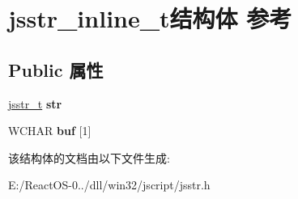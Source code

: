 \hypertarget{structjsstr__inline__t}{}\section{jsstr\+\_\+inline\+\_\+t结构体 参考}
\label{structjsstr__inline__t}
\subsection*{Public 属性}
\begin{DoxyCompactItemize}
\item 
\mbox{\label{structjsstr__inline__t_a8f6131c991535c1ef1b2f115cc5b0e30}} 
\hyperlink{struct__jsstr__t}{jsstr\+\_\+t} {\bfseries str}
\item 
\mbox{\label{structjsstr__inline__t_ac6dfdd7493e1260c4da2658517ff9d7a}} 
W\+C\+H\+AR {\bfseries buf} \mbox{[}1\mbox{]}
\end{DoxyCompactItemize}


该结构体的文档由以下文件生成\+:\begin{DoxyCompactItemize}
\item 
E\+:/\+React\+O\+S-\/0../dll/win32/jscript/jsstr.\+h\end{DoxyCompactItemize}
